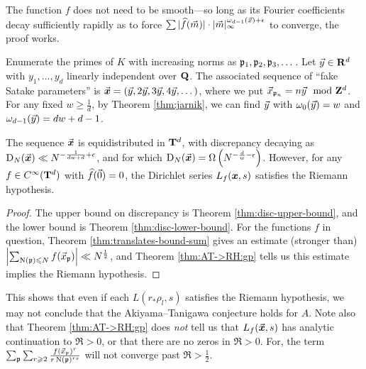 The function $f$ does not need to be smooth---so long as its Fourier 
coefficients decay sufficiently rapidly as to force 
$\sum |\widehat f(\vec{m})| \cdot |\vec{m}|_\infty^{\omega_{d-1}(\vec{x})+\epsilon}$ to 
converge, the proof works. 

Enumerate the primes of $K$ with increasing norms as $\mathfrak{p}_1,\mathfrak{p}_2,\mathfrak{p}_3,\dots$.  
Let $\vec{y}\in \mathbf{R}^d$ with $y_1,\dots,y_d$ linearly independent over $\mathbf{Q}$. The 
associated sequence of ``fake Satake parameters'' is 
$\vec{\boldsymbol x} = (\vec{y}, 2\vec{y}, 3 \vec{y}, 4 \vec{y}, \dots)$, 
where we put $\vec{x}_{\mathfrak{p}_n} = n \vec{y}\mod {\mathbf{Z}}^d$. For any fixed 
$w\geqslant \frac 1 d$, by Theorem \ref{thm:jarnik}, we can find $\vec{y}$ with 
$\omega_0(\vec{y}) = w$ and $\omega_{d-1}(\vec{y}) = d w + d - 1$. 

\begin{theorem}
The sequence $\vec{\boldsymbol x}$ is equidistributed in $\mathbf{T}^d$, with discrepancy 
decaying as $\operatorname{D}_N(\vec{\boldsymbol x}) \ll N^{-\frac{1}{d w+d} + \epsilon}$, and for which 
$\operatorname{D}_N(\vec{\boldsymbol x}) = \Omega\left(N^{-\frac{d}{w} - \epsilon}\right)$. 
However, for any $f\in C^\infty(\mathbf{T}^d)$ with $\widehat f(\vec{0})=0$, the 
Dirichlet series  $L_f({\boldsymbol x},s)$ satisfies the Riemann hypothesis. 
\end{theorem}
\begin{proof}
The upper bound on discrepancy is Theorem \ref{thm:disc-upper-bound}, and 
the lower bound is Theorem \ref{thm:disc-lower-bound}. For the functions $f$ in 
question, Theorem \ref{thm:translates-bound-sum} gives an estimate (stronger 
than) $\left| \sum_{\operatorname{N}(\mathfrak{p})\leqslant N} f(\vec{x}_{\mathfrak{p}})\right|\ll N^{\frac 1 2}$, and 
Theorem \ref{thm:AT->RH:gp} tells us this estimate implies the Riemann 
hypothesis. 
\end{proof}

This shows that even if each $L(r_\ast \rho_l,s)$ satisfies the Riemann 
hypothesis, we may not conclude that the Akiyama--Tanigawa 
conjecture holds for $A$. Note also that Theorem \ref{thm:AT->RH:gp} does 
\emph{not} tell us that $L_f(\vec{\boldsymbol x},s)$ has analytic continuation to $\Re > 0$, or 
that there are no zeros in $\Re > 0$. For, the term 
$\sum_{\mathfrak{p}} \sum_{r\geqslant 2} \frac{f(\vec{x}_{\mathfrak{p}})^r}{r \operatorname{N}(\mathfrak{p})^{r s}}$ will not 
converge past $\Re > \frac 1 2$.
